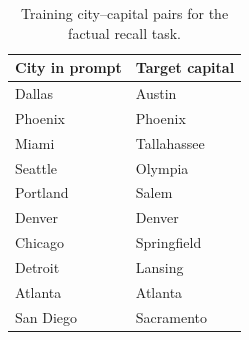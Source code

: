 \documentclass[11pt]{article}
\begin{document}
\begin{table}[ht]
\centering
\caption{Training city--capital pairs for the factual recall task.}
\label{tab:training_pairs}
\begin{tabular}{ll}
\toprule
\textbf{City in prompt} & \textbf{Target capital} \\
\midrule
Dallas       & Austin \\
Phoenix      & Phoenix \\
Miami        & Tallahassee \\
Seattle      & Olympia \\
Portland     & Salem \\
Denver       & Denver \\
Chicago      & Springfield \\
Detroit      & Lansing \\
Atlanta      & Atlanta \\
San Diego    & Sacramento \\
\bottomrule
\end{tabular}
\end{table}
\end{document}
